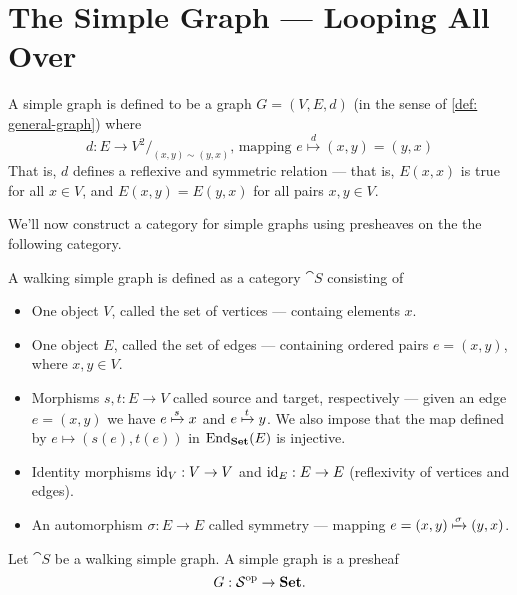\section{The Simple Graph --- Looping All Over}

\begin{definition}\label{def: simp-graph}
  A simple graph is defined to be a graph \(G = (V, E, d)\) (in the sense of
  \cref{def: general-graph}) where
  \[
    d: E \to V^2/_{(x, y) \sim (y, x)}
    \text{, mapping }
    e \overset d \longmapsto (x, y) = (y, x)
  \]
  That is, \(d\) defines a reflexive and symmetric relation --- that is, \(E(x,
  x)\) is true for all \(x \in V\), and \(E(x, y) = E(y, x)\) for all pairs \(x,
  y \in V\).
\end{definition}

We'll now construct a category for simple graphs using presheaves on the the
following category.

\begin{definition}\label{def: walking-simp-graph}
  A walking simple graph is defined as a category \(\cat S\) consisting of
  \begin{itemize}
    \setlength\itemsep{0.0em}
    \item One object \(V\), called the set of vertices --- containg elements
      \(x\).
    \item One object \(E\), called the set of edges --- containing ordered pairs
      \(e = (x, y)\), where \(x, y \in V\).
    \item Morphisms \(s, t: E \to V\) called source and target, respectively ---
      given an edge \(e = (x, y)\) we have \(e \xmapsto s x\) and \(e \xmapsto
      t y\). We also impose that the map defined by \(e \mapsto (s(e), t(e))\)
      in \(\operatorname{End}_{{\textbf{Set}}}(E)\) is injective.
    \item Identity morphisms \(\operatorname{id}_V: V \to V\) and \(\operatorname{id}_E: E \to E\)
      (reflexivity of vertices and edges).
    \item An automorphism \(\sigma: E \to E\) called symmetry --- mapping \(e =
      (x, y) \xmapsto\sigma (y, x)\).
  \end{itemize}
\end{definition}

\begin{proposition}\label{prop: simp-graph-presheaf}
  Let \(\cat S\) be a walking simple graph. A simple graph is a presheaf
  \[
    G: \mathcal S^{\mathrm{op}} \to {\textbf{Set}}.
  \]
\end{proposition}

